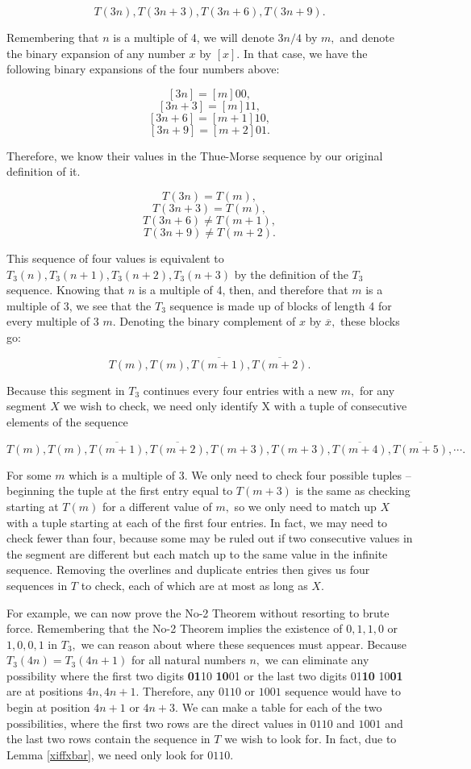 \documentclass{article}
\begin{document}
$$T(3n), T(3n+3), T(3n+6), T(3n+9).$$

 Remembering that $n$ is a multiple of 4, we will denote $3n/4$ by $m,$ and denote the binary expansion of any number $x$ by $[x].$ In that case, we have the following binary expansions of the four numbers above:

$$[3n] = [m]00,$$
$$[3n + 3] = [m]11,$$
$$[3n + 6] = [m+1]10,$$
$$[3n + 9] = [m+2]01.$$

Therefore, we know their values in the Thue-Morse sequence by our original definition of it.

$$T(3n) = T(m),$$
$$T(3n + 3) = T(m),$$
$$T(3n + 6) \neq T(m+1),$$
$$T(3n + 9) \neq T(m+2).$$

This sequence of four values is equivalent to $T_3(n), T_3(n+1), T_3(n+2), T_3(n+3)$ by the definition of the $T_3$ sequence. Knowing that $n$ is a multiple of 4, then, and therefore that $m$ is a multiple of 3, we see that the $T_3$ sequence is made up of blocks of length 4 for every multiple of 3 $m.$ Denoting the binary complement of $x$ by $\overline{x},$ these blocks go:

$$T(m), T(m), \overline{T(m+1)}, \overline{T(m+2)}.$$

Because this segment in $T_3$ continues every four entries with a new $m,$ for any segment $X$ we wish to check, we need only identify X with a tuple of consecutive elements of the sequence

$$T(m), T(m), \overline{T(m+1)}, \overline{T(m+2)}, T(m+3), T(m+3), \overline{T(m+4)}, \overline{T(m+5)}, \cdots .$$

For some $m$ which is a multiple of 3. We only need to check four possible tuples -- beginning the tuple at the first entry equal to $T(m+3)$ is the same as checking starting at $T(m)$ for a different value of $m,$ so we only need to match up $X$ with a tuple starting at each of the first four entries. In fact, we may need to check fewer than four, because some may be ruled out if two consecutive values in the segment are different but each match up to the same value in the infinite sequence. Removing the overlines and duplicate entries then gives us four sequences in $T$ to check, each of which are at most as long as $X.$

For example, we can now prove the No-2 Theorem without resorting to brute force. Remembering that the No-2 Theorem implies the existence of $0, 1, 1, 0$ or $1, 0, 0, 1$ in $T_3,$ we can reason about where these sequences must appear. Because $T_3(4n) = T_3(4n + 1)$ for all natural numbers $n,$ we can eliminate any possibility where the first two digits \textbf{01}10 \textbf{10}01 or the last two digits 01\textbf{10} 10\textbf{01} are at positions $4n, 4n+1.$ Therefore, any $0110$ or $1001$ sequence would have to begin at position $4n+1$ or $4n+3.$ We can make a table for each of the two possibilities, where the first two rows are the direct values in $0110$ and $1001$ and the last two rows contain the sequence in $T$ we wish to look for. In fact, due to Lemma \ref{xiffxbar}, we need only look for $0110.$
\end{document}
